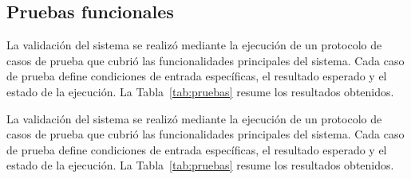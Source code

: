 \documentclass[12pt,a4paper,oneside]{report}
\begin{document}
\subsection{Pruebas funcionales}\label{subsec:pruebas-func}\label{resultados-pruebas}

La validación del sistema se realizó mediante la ejecución de un protocolo de casos de prueba que cubrió las funcionalidades principales del sistema. Cada caso de prueba define condiciones de entrada específicas, el resultado esperado y el estado de la ejecución. La Tabla~\ref{tab:pruebas} resume los resultados obtenidos.

La validación del sistema se realizó mediante la ejecución de un protocolo de casos de prueba que cubrió las funcionalidades principales del sistema. Cada caso de prueba define condiciones de entrada específicas, el resultado esperado y el estado de la ejecución. La Tabla~\ref{tab:pruebas} resume los resultados obtenidos.
\end{document}
